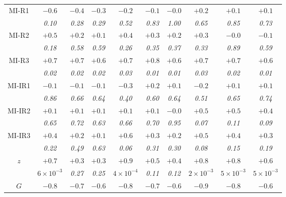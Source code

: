 \documentclass[referee]{aa}        %
\begin{document}
\begin{table}
\begin{tabular}{cccccccccc}
        MI-R1  &$-0.6$  &$-0.4$  &$-0.3$  &$-0.2$  &$-0.1$  &$-0.0$  &$+0.2$  &$+0.1$  &$+0.1$  \\
               &\textit{0.10}  &\textit{0.28}  &\textit{0.29}  &\textit{0.52}  &\textit{0.83}  &\textit{1.00}  &\textit{0.65}  &\textit{0.85}  &\textit{0.73}  \\
        MI-R2  &$+0.5$  &$+0.2$  &$+0.1$  &$+0.4$  &$+0.3$  &$+0.2$  &$+0.3$  &$-0.0$  &$-0.1$  \\
               &\textit{0.18}  &\textit{0.58}  &\textit{0.59}  &\textit{0.26}  &\textit{0.35}  &\textit{0.37}  &\textit{0.33}  &\textit{0.89}  &\textit{0.59}  \\
        MI-R3  &$+0.7$  &$+0.7$  &$+0.6$  &$+0.7$  &$+0.8$  &$+0.6$  &$+0.7$  &$+0.7$  &$+0.6$  \\
               &\textit{0.02}  &\textit{0.02}  &\textit{0.02}  &\textit{0.03}  &\textit{0.01}  &\textit{0.01}  &\textit{0.03}  &\textit{0.02}  &\textit{0.01}  \\
       MI-IR1  &$-0.1$  &$-0.1$  &$-0.1$  &$-0.3$  &$+0.2$  &$+0.1$  &$-0.2$  &$+0.1$  &$+0.1$  \\
               &\textit{0.86}  &\textit{0.66}  &\textit{0.64}  &\textit{0.40}  &\textit{0.60}  &\textit{0.64}  &\textit{0.51}  &\textit{0.65}  &\textit{0.74}  \\
       MI-IR2  &$+0.1$  &$+0.1$  &$+0.1$  &$+0.1$  &$+0.1$  &$-0.0$  &$+0.5$  &$+0.5$  &$+0.4$  \\
               &\textit{0.65}  &\textit{0.72}  &\textit{0.63}  &\textit{0.66}  &\textit{0.70}  &\textit{0.95}  &\textit{0.07}  &\textit{0.11}  &\textit{0.09}  \\
       MI-IR3  &$+0.4$  &$+0.2$  &$+0.1$  &$+0.6$  &$+0.3$  &$+0.2$  &$+0.5$  &$+0.4$  &$+0.3$  \\
               &\textit{0.22}  &\textit{0.49}  &\textit{0.63}  &\textit{0.06}  &\textit{0.31}  &\textit{0.30}  &\textit{0.08}  &\textit{0.15}  &\textit{0.19}  \\
       $z$  &$+0.7$  &$+0.3$  &$+0.3$  &$+0.9$  &$+0.5$  &$+0.4$  &$+0.8$  &$+0.8$  &$+0.6$  \\
            &\textit{$6 \times 10^{-3}$}  &\textit{0.27}  &\textit{0.25}  &\textit{$4 \times 10^{-4}$}
            &\textit{0.11}  &\textit{0.12}  &\textit{$2 \times 10^{-3}$}  &\textit{$5 \times 10^{-3}$}  &\textit{$5 \times 10^{-3}$}  \\
       \hline \noalign{\smallskip}
       $G$  &$-0.8$  &$-0.7$  &$-0.6$  &$-0.8$  &$-0.7$  &$-0.6$  &$-0.9$  &$-0.8$  &$-0.6$  \\

\end{tabular}
\end{table}
\end{document}

